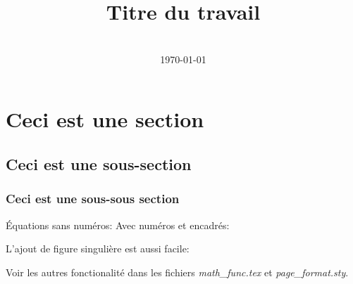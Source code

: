 \documentclass[12pt, a4paper]{article}
\title{Titre du travail} %
\author{\JL} %
\date{\US \\ \today} %
\begin{document}
\maketitlepage

\section{Ceci est une section}
\subsection{Ceci est une sous-section}
\subsubsection{Ceci est une sous-sous section}
Équations sans numéros:
Avec numéros et encadrés:



L'ajout de figure singulière est aussi facile:

Voir les autres fonctionalité dans les fichiers \textit{math\_func.tex} et \textit{page\_format.sty}.


\blankpage

\end{document}
